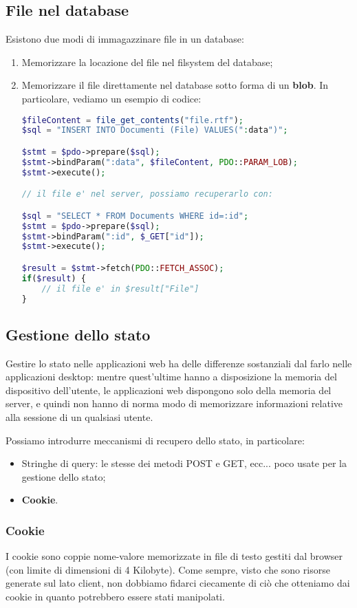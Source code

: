 \documentclass[a4paper,11pt]{article}
\begin{document}
\subsection{File nel database}
Esistono due modi di immagazzinare file in un database:
\begin{enumerate}
	\item Memorizzare la locazione del file nel filsystem del database;
	\item Memorizzare il file direttamente nel database sotto forma di un \textbf{blob}. In particolare, vediamo un esempio di codice:
\begin{lstlisting}[language=php, style=codestyle]	
$fileContent = file_get_contents("file.rtf");
$sql = "INSERT INTO Documenti (File) VALUES(":data")";

$stmt = $pdo->prepare($sql);
$stmt->bindParam(":data", $fileContent, PDO::PARAM_LOB);
$stmt->execute();

// il file e' nel server, possiamo recuperarlo con:

$sql = "SELECT * FROM Documents WHERE id=:id";
$stmt = $pdo->prepare($sql);
$stmt->bindParam(":id", $_GET["id"]);
$stmt->execute();

$result = $stmt->fetch(PDO::FETCH_ASSOC);
if($result) {
	// il file e' in $result["File"]
}
\end{lstlisting}
\end{enumerate}

\subsection{Gestione dello stato}
Gestire lo stato nelle applicazioni web ha delle differenze sostanziali dal farlo nelle applicazioni desktop: mentre quest'ultime hanno a disposizione la memoria del dispositivo dell'utente, le applicazioni web dispongono solo della memoria del server, e quindi non hanno di norma modo di memorizzare informazioni relative alla sessione di un qualsiasi utente.

Possiamo introdurre meccanismi di recupero dello stato, in particolare:
\begin{itemize}
	\item Stringhe di query: le stesse dei metodi POST e GET, ecc... poco usate per la gestione dello stato;
	\item \textbf{Cookie}.
\end{itemize}

\subsubsection{Cookie}
I cookie sono coppie nome-valore memorizzate in file di testo gestiti dal browser (con limite di dimensioni di 4 Kilobyte).
Come sempre, visto che sono risorse generate sul lato client, non dobbiamo fidarci ciecamente di ciò che otteniamo dai cookie in quanto potrebbero essere stati manipolati.
\end{document}

